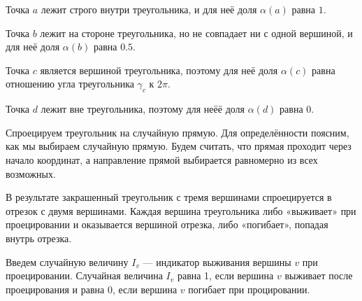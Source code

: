 \documentclass[12pt]{article} %
\theoremstyle{definition} %
\begin{document}
\begin{minipage}{0.99\textwidth}
\begin{center}
\end{center}
\end{minipage}
  


Точка $a$ лежит строго внутри треугольника, 
и для неё доля $\alpha(a)$ равна $1$.

Точка $b$ лежит на стороне треугольника, но не совпадает ни с одной вершиной, 
и для неё доля $\alpha(b)$ равна $0.5$.

Точка $c$ является вершиной треугольника, поэтому для неё доля $\alpha(c)$
равна отношению угла треугольника $\gamma_c$ к $2\pi$.

Точка $d$ лежит вне треугольника, поэтому для неёё доля $\alpha(d)$ равна $0$.


Спроецируем треугольник на случайную прямую. 
Для определённости поясним, как мы выбираем случайную прямую. 
Будем считать, что прямая проходит через начало координат, а направление прямой выбирается равномерно из всех возможных.

В результате закрашенный треугольник с тремя вершинами спроецируется в отрезок с двумя вершинами.
Каждая вершина треугольника либо «выживает» при проецировании и оказывается вершиной отрезка,
либо «погибает», попадая внутрь отрезка.


Введем случайную величину $I_v$ — индикатор выживания вершины $v$ при проецировании.
Случайная величина $I_v$ равна 1, если вершина $v$ выживает после проецирования и равна 0, если 
вершина $v$ погибает при процировании. 
\end{document}
